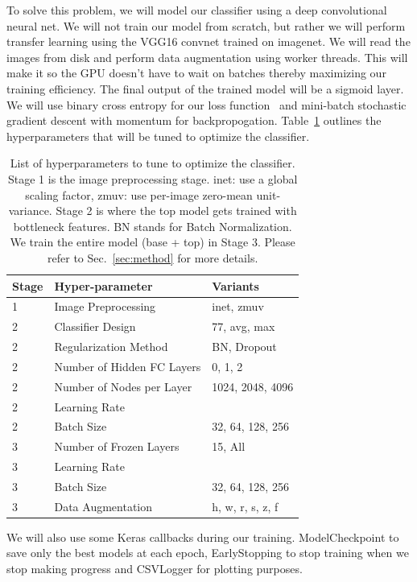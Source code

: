 \documentclass[12pt,journal,compsoc]{IEEEtran}
\begin{document}
To solve this problem, we will model our classifier using a deep convolutional neural net.  We will not train our model from scratch, but rather we will perform transfer learning using the VGG16 convnet trained on imagenet.  We will read the images from disk and perform data augmentation using worker threads.  This will make it so the GPU doesn't have to wait on batches thereby maximizing our training efficiency. The final output of the trained model will be a sigmoid layer.  We will use binary cross entropy for our loss function~\cite{deBoer2005} and mini-batch stochastic gradient descent with momentum for backpropogation. Table~\ref{tab:hyperparams} outlines the hyperparameters that will be tuned to optimize the classifier.
\begin{table}
\label{tab:hyperparams}
\caption{List of hyperparameters to tune to optimize the classifier.  Stage 1 is the image preprocessing stage. inet: use a global scaling factor, zmuv: use per-image zero-mean unit-variance.  Stage 2 is where the top model gets trained with bottleneck features. BN stands for Batch Normalization. We train the entire model (base + top) in Stage 3.  Please refer to Sec.~\ref{sec:method} for more details.}
\begin{tabular}{lll}
\hline
Stage & Hyper-parameter & Variants \\
\hline
1 & Image Preprocessing & inet, zmuv \\
\hline
2 & Classifier Design & 77, avg, max \\
2 & Regularization Method & BN, Dropout \\
2 & Number of Hidden FC Layers & 0, 1, 2 \\
2 & Number of Nodes per Layer & 1024, 2048, 4096 \\
2 & Learning Rate & \\
2 & Batch Size & 32, 64, 128, 256\\
\hline
3 & Number of Frozen Layers & 15, All \\
3 & Learning Rate & \\
3 & Batch Size & 32, 64, 128, 256 \\
3 & Data Augmentation & h, w, r, s, z, f \\
\hline
\end{tabular}
\end{table}
We will also use some Keras callbacks during our training.  ModelCheckpoint to save only the best models at each epoch, EarlyStopping to stop training when we stop making progress and CSVLogger for plotting purposes.
\end{document}
